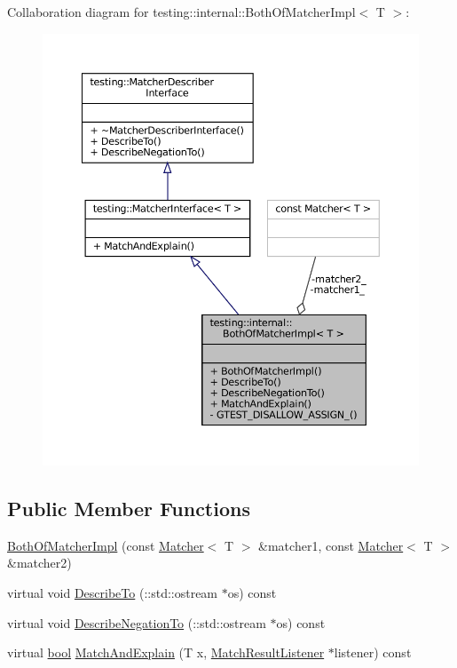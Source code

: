 Collaboration diagram for testing\+:\+:internal\+:\+:Both\+Of\+Matcher\+Impl$<$ T $>$\+:
\nopagebreak
\begin{figure}[H]
\begin{center}
\leavevmode
\includegraphics[width=350pt]{classtesting_1_1internal_1_1BothOfMatcherImpl__coll__graph}
\end{center}
\end{figure}
\subsection*{Public Member Functions}
\begin{DoxyCompactItemize}
\item 
\hyperlink{classtesting_1_1internal_1_1BothOfMatcherImpl_a41760fcb35ba18ac2a0eb580ac61ea9a}{Both\+Of\+Matcher\+Impl} (const \hyperlink{classtesting_1_1Matcher}{Matcher}$<$ T $>$ \&matcher1, const \hyperlink{classtesting_1_1Matcher}{Matcher}$<$ T $>$ \&matcher2)
\item 
virtual void \hyperlink{classtesting_1_1internal_1_1BothOfMatcherImpl_a3a1f92f7b093d36ab38c35fbcae4ce4d}{Describe\+To} (\+::std\+::ostream $\ast$os) const
\item 
virtual void \hyperlink{classtesting_1_1internal_1_1BothOfMatcherImpl_a4f6017c7aca6e5c8166ff4c613d8dbec}{Describe\+Negation\+To} (\+::std\+::ostream $\ast$os) const
\item 
virtual \hyperlink{classbool}{bool} \hyperlink{classtesting_1_1internal_1_1BothOfMatcherImpl_a4f3e5edf69d168fef8bec577313748f4}{Match\+And\+Explain} (T x, \hyperlink{classtesting_1_1MatchResultListener}{Match\+Result\+Listener} $\ast$listener) const
\end{DoxyCompactItemize}
